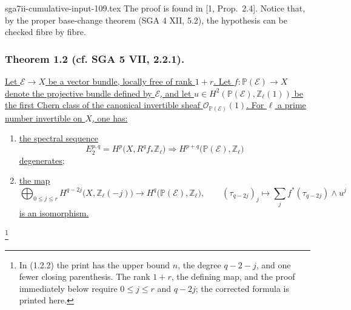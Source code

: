 \begin{filecontents*}{sga7ii-cumulative-input-109.tex}
The proof is found in [1, Prop.~2.4]. Notice that, by the proper base-change
theorem (SGA 4 XII, 5.2), the hypothesis can be checked fibre by fibre.

\subsubsection*{Theorem 1.2 (cf. SGA 5 VII, 2.2.1).}
\underline{Let $\mathcal E\longrightarrow X$ be a vector bundle, locally
free of rank $1+r$. Let $f:\mathbb P(\mathcal E)\longrightarrow X$ denote
the projective bundle defined by $\mathcal E$, and let
$u\in H^2(\mathbb P(\mathcal E),\mathbb Z_\ell(1))$ be the first Chern
class of the canonical invertible sheaf
$\mathcal O_{\mathbb P(\mathcal E)}(1)$. For $\ell$ a prime number
invertible on $X$, one has:}
\begin{enumerate}[label=\alph*)]
\item \underline{the spectral sequence}
\begin{equation}\tag{1.2.1}
E_2^{p,q}=H^p\bigl(X,R^qf_*\mathbb Z_\ell\bigr)
\Longrightarrow
H^{p+q}\bigl(\mathbb P(\mathcal E),\mathbb Z_\ell\bigr)
\end{equation}
\underline{degenerates;}
\item \underline{the map}
\begin{equation}\tag{1.2.2}
\bigoplus_{0\leq j\leq r}
H^{q-2j}\bigl(X,\mathbb Z_\ell(-j)\bigr)
\longrightarrow
H^q\bigl(\mathbb P(\mathcal E),\mathbb Z_\ell\bigr),
\qquad
(\tau_{q-2j})_j\longmapsto
\sum_j f^*(\tau_{q-2j})\wedge u^j
\end{equation}
\underline{is an isomorphism.}
\end{enumerate}
\footnote{In (1.2.2) the print has the upper bound $n$, the degree
$q-2-j$, and one fewer closing parenthesis. The rank $1+r$, the defining
map, and the proof immediately below require $0\leq j\leq r$ and $q-2j$;
the corrected formula is printed here.}


\end{filecontents*}

